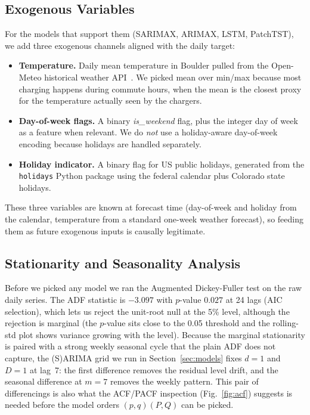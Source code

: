 \subsection{Exogenous Variables}

For the models that support them (SARIMAX, ARIMAX, LSTM, PatchTST), we
add three exogenous channels aligned with the daily target:
\begin{itemize}[leftmargin=*]
    \item \textbf{Temperature.} Daily mean temperature in Boulder
    pulled from the Open-Meteo historical weather
    API~\cite{openmeteo}. We picked mean over min/max because most
    charging happens during commute hours, when the mean is the
    closest proxy for the temperature actually seen by the chargers.
    \item \textbf{Day-of-week flags.} A binary \emph{is\_weekend}
    flag, plus the integer day of week as a feature when relevant. We
    do \emph{not} use a holiday-aware day-of-week encoding because
    holidays are handled separately.
    \item \textbf{Holiday indicator.} A binary flag for US public
    holidays, generated from the \texttt{holidays} Python package
    using the federal calendar plus Colorado state holidays.
\end{itemize}
These three variables are known at forecast time (day-of-week and
holiday from the calendar, temperature from a standard one-week
weather forecast), so feeding them as future exogenous inputs is
causally legitimate.

\subsection{Stationarity and Seasonality Analysis}

Before we picked any model we ran the Augmented Dickey-Fuller test on
the raw daily series. The ADF statistic is $-3.097$ with $p$-value
$0.027$ at 24 lags (AIC selection), which lets us reject the unit-root
null at the 5\% level, although the rejection is marginal (the
$p$-value sits close to the 0.05 threshold and the rolling-std plot
shows variance growing with the level). Because the marginal
stationarity is paired with a strong weekly seasonal cycle that the
plain ADF does not capture, the (S)ARIMA grid we run in
Section~\ref{sec:models} fixes $d=1$ and $D=1$ at lag~7: the first
difference removes the residual level drift, and the seasonal
difference at $m=7$ removes the weekly pattern. This pair of
differencings is also what the ACF/PACF inspection
(Fig.~\ref{fig:acf}) suggests is needed before the model orders
$(p,q)(P,Q)$ can be picked.

